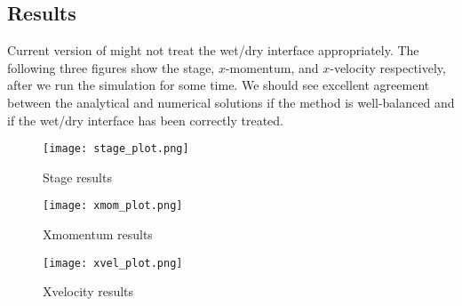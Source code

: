 \subsection{Results}


Current version of \anuga{} might not treat the wet/dry interface appropriately. The following three figures show the stage, $x$-momentum, and $x$-velocity respectively, after we run the simulation for some time. We should see excellent agreement between the analytical and numerical solutions if the method is well-balanced and if the wet/dry interface has been correctly treated.

\begin{figure}
\begin{center}
\texttt{[image: stage\_plot.png]}
\end{center}
\caption{Stage results}
\end{figure}


\begin{figure}
\begin{center}
\texttt{[image: xmom\_plot.png]}
\end{center}
\caption{Xmomentum results}
\end{figure}


\begin{figure}
\begin{center}
\texttt{[image: xvel\_plot.png]}
\end{center}
\caption{Xvelocity results}
\end{figure}


\endinput
